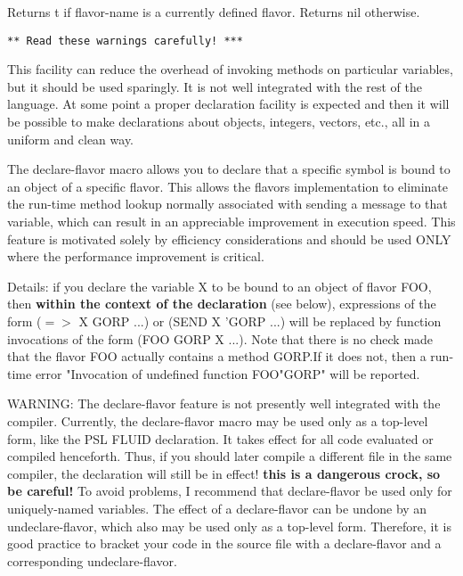 {
    Returns  t  if  flavor-name  is  a currently defined flavor.
    Returns nil otherwise.
}

{ 
}

{
{\tt  *** Read these warnings carefully! ***}

  This facility can reduce the overhead of invoking  methods  on
particular  variables,  but  it should be used sparingly.  It is
not well integrated with the rest of  the  language.    At  some
point a proper declaration facility is expected and then it will
be  possible  to  make  declarations  about  objects,  integers,
vectors, etc., all in a uniform and clean way.
}

The declare-flavor macro allows you to declare that a specific
symbol is bound to an object of a specific flavor.  This  allows
the  flavors  implementation  to  eliminate  the run-time method
lookup normally  associated  with  sending  a  message  to  that
variable,  which  can  result  in  an appreciable improvement in
execution speed.  This feature is motivated solely by efficiency
considerations and should be used  ONLY  where  the  performance
improvement is critical.

  Details:  if  you  declare  the  variable  X to be bound to an
object of flavor FOO, then {\bf within the context of the declaration}
(see below), expressions of the form ($=>$ X GORP ...) or
(SEND X 'GORP ...) will be replaced by function invocations of the form
(FOO GORP X ...). Note that there is no  check made that the
flavor FOO actually contains a method GORP.If it does not, then a 
run-time error "Invocation of undefined function FOO"GORP" will be
reported.
  
WARNING:  The  declare-flavor  feature  is  not presently well
integrated with the compiler. Currently,  the  declare-flavor
macro  may  be used only as a top-level form, like the PSL FLUID
declaration.  It takes effect for all code evaluated or compiled
henceforth.  Thus, if you should later compile a different  file
in  the  same compiler, the declaration will still be in effect!
{\bf this is a dangerous crock, so be careful!}  To
avoid problems, I recommend  that  declare-flavor  be used only for
uniquely-named variables. The effect of a declare-flavor can be
undone  by an undeclare-flavor, which  also  may  be used only as a
top-level form. Therefore, it is good practice to bracket  your code in
the  source  file  with  a  declare-flavor  and  a corresponding
undeclare-flavor.

